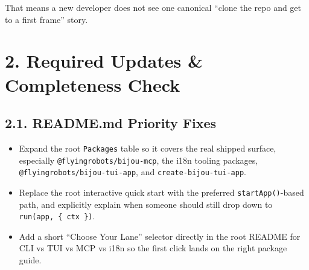 That means a new developer does not see one canonical ``clone the repo and get to a first frame'' story.

\section{2. Required Updates \& Completeness Check}\label{record-417-required-updates-completeness-check}

\subsection{2.1. README.md Priority Fixes}\label{record-417-readme.md-priority-fixes}

\begin{itemize}
\tightlist
\item
  Expand the root \texttt{P\allowbreak{}a\allowbreak{}c\allowbreak{}k\allowbreak{}a\allowbreak{}g\allowbreak{}e\allowbreak{}s} table so it covers the real shipped surface, especially \texttt{@\allowbreak{}f\allowbreak{}l\allowbreak{}y\allowbreak{}i\allowbreak{}n\allowbreak{}g\allowbreak{}r\allowbreak{}o\allowbreak{}b\allowbreak{}o\allowbreak{}t\allowbreak{}s\allowbreak{}/\allowbreak{}b\allowbreak{}i\allowbreak{}j\allowbreak{}o\allowbreak{}u\allowbreak{}-\allowbreak{}m\allowbreak{}c\allowbreak{}p}, the i18n tooling packages, \texttt{@\allowbreak{}f\allowbreak{}l\allowbreak{}y\allowbreak{}i\allowbreak{}n\allowbreak{}g\allowbreak{}r\allowbreak{}o\allowbreak{}b\allowbreak{}o\allowbreak{}t\allowbreak{}s\allowbreak{}/\allowbreak{}b\allowbreak{}i\allowbreak{}j\allowbreak{}o\allowbreak{}u\allowbreak{}-\allowbreak{}t\allowbreak{}u\allowbreak{}i\allowbreak{}-\allowbreak{}a\allowbreak{}p\allowbreak{}p}, and \texttt{c\allowbreak{}r\allowbreak{}e\allowbreak{}a\allowbreak{}t\allowbreak{}e\allowbreak{}-\allowbreak{}b\allowbreak{}i\allowbreak{}j\allowbreak{}o\allowbreak{}u\allowbreak{}-\allowbreak{}t\allowbreak{}u\allowbreak{}i\allowbreak{}-\allowbreak{}a\allowbreak{}p\allowbreak{}p}.
\item
  Replace the root interactive quick start with the preferred \texttt{s\allowbreak{}t\allowbreak{}a\allowbreak{}r\allowbreak{}t\allowbreak{}A\allowbreak{}p\allowbreak{}p\allowbreak{}(\allowbreak{})}-based path, and explicitly explain when someone should still drop down to \texttt{r\allowbreak{}u\allowbreak{}n\allowbreak{}(\allowbreak{}a\allowbreak{}p\allowbreak{}p\allowbreak{},\allowbreak{} \allowbreak{}\{\allowbreak{} \allowbreak{}c\allowbreak{}t\allowbreak{}x\allowbreak{} \allowbreak{}\}\allowbreak{})}.
\item
  Add a short ``Choose Your Lane'' selector directly in the root README for CLI vs TUI vs MCP vs i18n so the first click lands on the right package guide.
\end{itemize}

